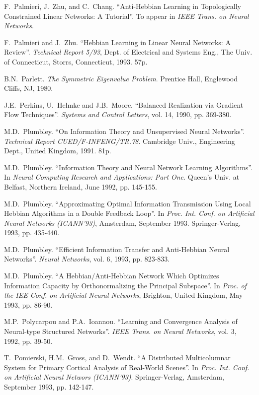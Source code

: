\begin{thebibliography}{999}
F.~Palmieri, J.~Zhu, and C.~Chang.
``Anti-Hebbian Learning in Topologically Constrained Linear Networks:
A Tutorial''.
To appear in {\em IEEE Trans. on Neural Networks}.

F.~Palmieri and J.~Zhu.
``Hebbian Learning in Linear Neural Networks: A Review''.
{\em Technical Report 5/93}, Dept. of Electrical and Systems Eng., The
Univ. of Connecticut, Storrs, Connecticut, 1993. 57p.

B.N.~Parlett.
{\em The Symmetric Eigenvalue Problem}.
Prentice Hall, Englewood Cliffs, NJ, 1980.
 
J.E.~Perkins, U.~Helmke and J.B.~Moore.
``Balanced Realization via Gradient Flow Techniques''.
{\em Systems and Control Letters}, vol. 14, 1990, pp. 369-380.
 
M.D.~Plumbley.
``On Information Theory and Unsupervised Neural Networks''.
{\em Technical Report CUED/F-INFENG/TR.78}. Cambridge Univ.,
Engineering Dept., United Kingdom, 1991. 81p.

M.D.~Plumbley.
``Information Theory and Neural Network Learning Algorithms''.
In {\em Neural Computing Research and Applications: Part One}.
Queen's Univ. at Belfast, Northern Ireland, June 1992, pp. 145-155.
 
M.D.~Plumbley.
``Approximating Optimal Information Transmission Using Local Hebbian 
Algorithms in a Double Feedback Loop''.
In {\em Proc. Int. Conf. on Artificial Neural Networks (ICANN'93)},
Amsterdam, September 1993. Springer-Verlag, 1993, pp. 435-440.
 
M.D.~Plumbley.
``Efficient Information Transfer and Anti-Hebbian Neural Networks''.
{\em Neural Networks}, vol. 6, 1993, pp. 823-833.

M.D.~Plumbley.
``A Hebbian/Anti-Hebbian Network Which Optimizes Information
Capacity by Orthonormalizing the Principal Subspace''.
In {\em Proc. of the IEE Conf. on Artificial Neural Networks},
Brighton, United Kingdom, May 1993, pp. 86-90.

M.P.~Polycarpou and P.A.~Ioannou.
``Learning and Convergence Analysis of Neural-type Structured Networks''.
{\em IEEE Trans. on Neural Networks}, vol. 3, 1992, pp. 39-50.

T.~Pomierski, H.M.~Gross, and D.~Wendt.
``A Distributed Multicolumnar System for Primary Cortical Analysis
of Real-World Scenes''.
In {\em Proc. Int. Conf. on Artificial Neural Networs (ICANN'93)}.
Springer-Verlag, Amsterdam, September 1993, pp. 142-147.


\end{thebibliography}
